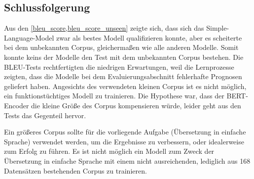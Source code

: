 \subsection{Schlussfolgerung}
Aus den \cref{bleu_score,bleu_score_unseen} zeigte sich, dass sich das Simple-Language-Model zwar als bestes Modell qualifizieren konnte, aber es scheiterte bei dem unbekannten Corpus, gleichermaßen wie alle anderen Modelle. Somit konnte keins der Modelle den Test mit dem unbekannten Corpus bestehen. Die BLEU-Tests rechtfertigten die niedrigen Erwartungen, weil die Lernprozesse zeigten, dass die Modelle bei dem Evaluierungsabschnitt fehlerhafte Prognosen geliefert haben. Angesichts des verwendeten kleinen Corpus ist es nicht möglich, ein funktionstüchtiges Modell zu trainieren. Die Hypothese war, dass der BERT-Encoder die kleine Größe des Corpus kompensieren würde, leider geht aus den Tests das Gegenteil hervor. 

Ein größeres Corpus sollte für die vorliegende Aufgabe (Übersetzung in einfache Sprache) verwendet werden, um die Ergebnisse zu verbessern, oder idealerweise zum Erfolg zu führen. Es ist nicht möglich ein Modell zum Zweck der Übersetzung in einfache Sprache mit einem nicht ausreichenden, lediglich aus 168 Datensätzen bestehenden Corpus zu trainieren.

